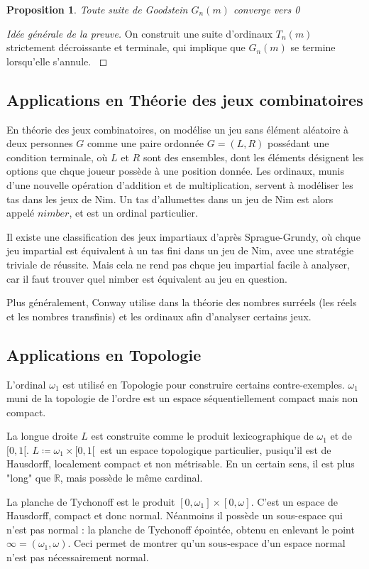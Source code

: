 \documentclass[french]{article}
\theoremstyle{definition}
\theoremstyle{plain}
\newtheorem{proposition}[subsubsection]{Proposition}
\theoremstyle{plain}
\theoremstyle{plain}
\theoremstyle{plain}
\theoremstyle{plain}
\begin{document}
\begin{proposition}
	Toute suite de Goodstein \( G_{n}(m) \) converge vers 0
\end{proposition}

\begin{proof}[Idée générale de la preuve]
	On construit une suite d'ordinaux \( T_{n}(m) \) strictement décroissante et terminale, qui implique que \( G_{n}(m) \) se termine lorsqu'elle s'annule. \cite{dehornoy2017théorie}
\end{proof}

\subsection{Applications en Théorie des jeux combinatoires}

\par En théorie des jeux combinatoires, on modélise un jeu sans élément aléatoire à deux personnes \( G \) comme une paire ordonnée \( G=(L,R) \) possédant une condition terminale, où \( L \) et \( R \) sont des ensembles, dont les éléments désignent les options que chque joueur possède à une position donnée. Les ordinaux, munis d'une nouvelle opération d'addition et de multiplication, servent à modéliser les tas dans les jeux de Nim. Un tas d'allumettes dans un jeu de Nim est alors appelé \( nimber \), et est un ordinal particulier. 

Il existe une classification des jeux impartiaux d'après Sprague-Grundy, où chque jeu impartial est équivalent à un tas fini dans un jeu de Nim, avec une stratégie triviale de réussite. Mais cela ne rend pas chque jeu impartial facile à analyser, car il faut trouver quel nimber est équivalent au jeu en question. \cite{schleicher2005introduction}

Plus généralement, Conway utilise dans \cite{conway2000onag} la théorie des nombres surréels (les réels et les nombres transfinis) et les ordinaux afin d'analyser certains jeux. 


\subsection{Applications en Topologie}
\par L'ordinal \( \omega_{1} \) est utilisé en Topologie pour construire certains contre-exemples. \( \omega_{1} \) muni de la topologie de l'ordre est un espace séquentiellement compact mais non compact.
\par La longue droite \( L \) est construite comme le produit lexicographique de \( \omega_{1} \) et de \( [0,1[ \). \( L \coloneqq \omega_{1} \times [0,1[ \ \) est un espace topologique particulier, pusiqu'il est de Hausdorff, localement compact et non métrisable. En un certain sens, il est plus "long" que \( \mathbb{R} \), mais possède le même cardinal. 
\par La planche de Tychonoff est le produit \( [0, \omega_{1}] \times [0,\omega] \). C'est un espace de Hausdorff, compact et donc normal. Néanmoins il possède un sous-espace qui n'est pas normal : la planche de Tychonoff épointée, obtenu en enlevant le point \( \infty = (\omega_{1}, \omega) \). Ceci permet de montrer qu'un sous-espace d'un espace normal n'est pas nécessairement normal. \cite{1103518}
\end{document}
